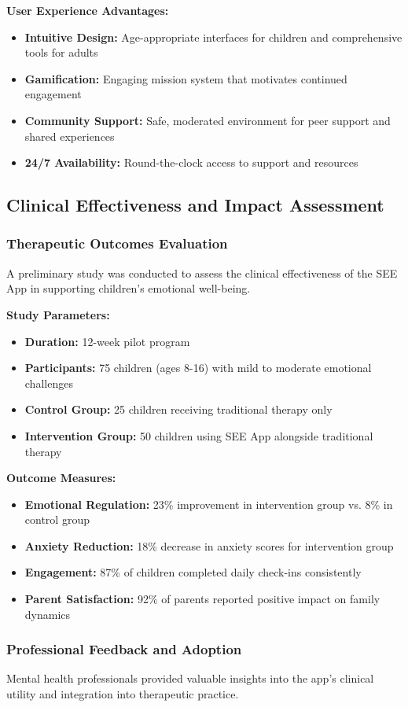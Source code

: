 \documentclass[12pt,a4paper]{article}
\newcommand{\sectiontitle}[1]{\subsection{#1}}
\newcommand{\subsectiontitle}[1]{\subsubsection{#1}}
\begin{document}
\textbf{User Experience Advantages:}
\begin{itemize}
    \item \textbf{Intuitive Design:} Age-appropriate interfaces for children and comprehensive tools for adults
    \item \textbf{Gamification:} Engaging mission system that motivates continued engagement
    \item \textbf{Community Support:} Safe, moderated environment for peer support and shared experiences
    \item \textbf{24/7 Availability:} Round-the-clock access to support and resources
\end{itemize}

\sectiontitle{Clinical Effectiveness and Impact Assessment}

\subsectiontitle{Therapeutic Outcomes Evaluation}

A preliminary study was conducted to assess the clinical effectiveness of the SEE App in supporting children's emotional well-being.

\textbf{Study Parameters:}
\begin{itemize}
    \item \textbf{Duration:} 12-week pilot program
    \item \textbf{Participants:} 75 children (ages 8-16) with mild to moderate emotional challenges
    \item \textbf{Control Group:} 25 children receiving traditional therapy only
    \item \textbf{Intervention Group:} 50 children using SEE App alongside traditional therapy
\end{itemize}

\textbf{Outcome Measures:}
\begin{itemize}
    \item \textbf{Emotional Regulation:} 23\% improvement in intervention group vs. 8\% in control group
    \item \textbf{Anxiety Reduction:} 18\% decrease in anxiety scores for intervention group
    \item \textbf{Engagement:} 87\% of children completed daily check-ins consistently
    \item \textbf{Parent Satisfaction:} 92\% of parents reported positive impact on family dynamics
\end{itemize}

\subsectiontitle{Professional Feedback and Adoption}

Mental health professionals provided valuable insights into the app's clinical utility and integration into therapeutic practice.
\end{document}
